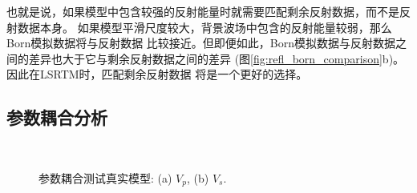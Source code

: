 也就是说，如果模型中包含较强的反射能量时就需要匹配剩余反射数据，而不是反射数据本身。
如果模型平滑尺度较大，背景波场中包含的反射能量较弱，那么Born模拟数据将与反射数据
比较接近。但即便如此，Born模拟数据与反射数据之间的差异也大于它与剩余反射数据之间的差异
(图\ref{fig:refl_born_comparison}b)。因此在LSRTM时，匹配剩余反射数据
将是一个更好的选择。
\subsection{参数耦合分析}
\begin{figure}[!htb]
   \centering
   \\
   \caption{参数耦合测试真实模型: (a) $V_p$, (b) $V_s$.}
   \label{fig:tradeoffModel}
\end{figure}
